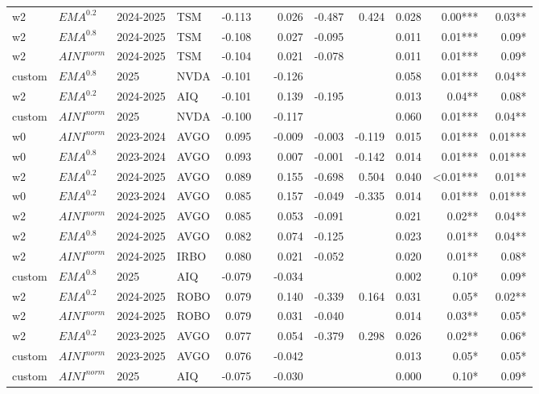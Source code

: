 {\begin{tabularx}{\textwidth}{@{}X@{\hspace{0.5pt}}X@{\hspace{0.5pt}}X@{\hspace{0.5pt}}X@{\hspace{2.0pt}} r r r r r r r r@{}}
w2 & $EMA^{0.2}$ & 2024-2025 & TSM & -0.113 &  & 0.026 & -0.487 & 0.424 & 0.028 & 0.00*** & 0.03** \\
w2 & $EMA^{0.8}$ & 2024-2025 & TSM & -0.108 &  & 0.027 & -0.095 &  & 0.011 & 0.01*** & 0.09* \\
w2 & $AINI^{norm}$ & 2024-2025 & TSM & -0.104 &  & 0.021 & -0.078 &  & 0.011 & 0.01*** & 0.09* \\
custom & $EMA^{0.8}$ & 2025 & NVDA & -0.101 &  & -0.126 &  &  & 0.058 & 0.01*** & 0.04** \\
w2 & $EMA^{0.2}$ & 2024-2025 & AIQ & -0.101 &  & 0.139 & -0.195 &  & 0.013 & 0.04** & 0.08* \\
custom & $AINI^{norm}$ & 2025 & NVDA & -0.100 &  & -0.117 &  &  & 0.060 & 0.01*** & 0.04** \\
w0 & $AINI^{norm}$ & 2023-2024 & AVGO & 0.095 &  & -0.009 & -0.003 & -0.119 & 0.015 & 0.01*** & 0.01*** \\
w0 & $EMA^{0.8}$ & 2023-2024 & AVGO & 0.093 &  & 0.007 & -0.001 & -0.142 & 0.014 & 0.01*** & 0.01*** \\
w2 & $EMA^{0.2}$ & 2024-2025 & AVGO & 0.089 &  & 0.155 & -0.698 & 0.504 & 0.040 & \textless{}0.01*** & 0.01** \\
w0 & $EMA^{0.2}$ & 2023-2024 & AVGO & 0.085 &  & 0.157 & -0.049 & -0.335 & 0.014 & 0.01*** & 0.01*** \\
w2 & $AINI^{norm}$ & 2024-2025 & AVGO & 0.085 &  & 0.053 & -0.091 &  & 0.021 & 0.02** & 0.04** \\
w2 & $EMA^{0.8}$ & 2024-2025 & AVGO & 0.082 &  & 0.074 & -0.125 &  & 0.023 & 0.01** & 0.04** \\
w2 & $AINI^{norm}$ & 2024-2025 & IRBO & 0.080 &  & 0.021 & -0.052 &  & 0.020 & 0.01** & 0.08* \\
custom & $EMA^{0.8}$ & 2025 & AIQ & -0.079 &  & -0.034 &  &  & 0.002 & 0.10* & 0.09* \\
w2 & $EMA^{0.2}$ & 2024-2025 & ROBO & 0.079 &  & 0.140 & -0.339 & 0.164 & 0.031 & 0.05* & 0.02** \\
w2 & $AINI^{norm}$ & 2024-2025 & ROBO & 0.079 &  & 0.031 & -0.040 &  & 0.014 & 0.03** & 0.05* \\
w2 & $EMA^{0.2}$ & 2023-2025 & AVGO & 0.077 &  & 0.054 & -0.379 & 0.298 & 0.026 & 0.02** & 0.06* \\
custom & $AINI^{norm}$ & 2023-2025 & AVGO & 0.076 &  & -0.042 &  &  & 0.013 & 0.05* & 0.05* \\
custom & $AINI^{norm}$ & 2025 & AIQ & -0.075 &  & -0.030 &  &  & 0.000 & 0.10* & 0.09* \\

\end{tabularx}}
